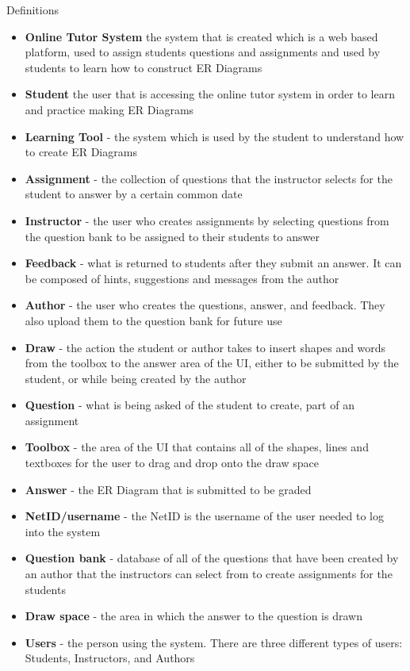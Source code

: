 	\begin{chapter}{Definitions}
 		\begin{itemize}
 			\item{\textbf{Online Tutor System}  the system that is created which is a web based platform, 
 			used to assign students questions and assignments and used by students to learn how to 
 			construct ER Diagrams}
			\item{\textbf{Student}  the user that is accessing the online tutor system in order to learn 
			and practice making ER Diagrams}
			\item{\textbf{Learning Tool} - the system which is used by the student to understand how to 
			create ER Diagrams}
			\item{\textbf{Assignment} - the collection of questions that the instructor selects for the 
			student to answer by a certain common date}
			\item{\textbf{Instructor} - the user who creates assignments by selecting questions from the 
			question bank to be assigned to their students to answer}
			\item{\textbf{Feedback} - what is returned to students after they submit an answer.  It can be 
			composed of hints, suggestions and messages from the author}
			\item{\textbf{Author} - the user who creates the questions, answer, and feedback.  They also 
			upload them to the question bank for future use}
			\item{\textbf{Draw} - the action the student or author takes to insert shapes and words from 
			the toolbox to the answer area of the UI, either to be submitted by the student, or while 
			being created by the author}
			\item{\textbf{Question} - what is being asked of the student to create, part of an assignment}
			\item{\textbf{Toolbox} - the area of the UI that contains all of the shapes, lines and textboxes 
			for the user to drag and drop onto the draw space}
			\item{\textbf{Answer} - the ER Diagram that is submitted to be graded}
			\item{\textbf{NetID/username} - the NetID is the username of the user needed to log into the 
			system}
			\item{\textbf{Question bank} - database of all of the questions that have been created by an 
			author that the instructors can select from to create assignments for the students}
			\item{\textbf{Draw space} - the area in which the answer to the question is drawn}
			\item{\textbf{Users} - the person using the system. There are three different types of users: 
			Students, Instructors, and Authors}
		\end{itemize}
	\end{chapter}
